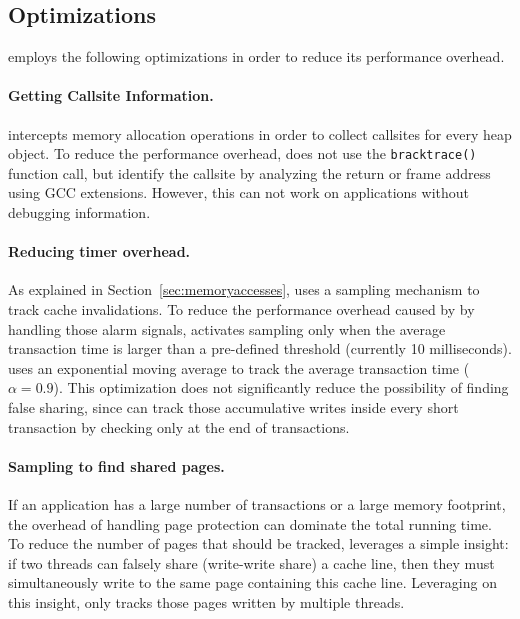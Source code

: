 \subsection{Optimizations}

\SheriffDetect{} employs the following optimizations in order to reduce its performance overhead. 

\paragraph{Getting Callsite Information.}
\label{sec:sheriffcallsite}

\SheriffDetect{} intercepts memory allocation operations in order to collect callsites for every heap object. To reduce the performance overhead, \SheriffDetect{} does not use the \texttt{bracktrace()} function call, but identify the callsite by analyzing the return or frame address using GCC extensions. However, this can not work on applications without debugging information. 

\paragraph{Reducing timer overhead.}
As explained in Section~\ref{sec:memoryaccesses}, \SheriffDetect{} uses a sampling mechanism to track cache invalidations. To reduce the performance overhead caused by by handling those alarm signals, \SheriffDetect{} activates sampling only when the average transaction time is larger than a pre-defined threshold (currently 10 milliseconds). \SheriffDetect{} uses an exponential moving average to track the average transaction time ($\alpha = 0.9$). This optimization does not significantly reduce the possibility of finding false sharing, since \SheriffDetect{} can track those accumulative writes inside every short transaction by checking only at the end of transactions.

\paragraph{Sampling to find shared pages.} 
If an application has a large number of transactions or a large memory footprint, the overhead of handling page protection can dominate the total running time.
To reduce the number of pages that should be tracked, \SheriffDetect{} leverages a
simple insight: if two threads can falsely share (write-write share) a cache line, then they must simultaneously write to the same page containing this cache line. 
Leveraging on this insight, \SheriffDetect{} only tracks those pages written by multiple threads. 

